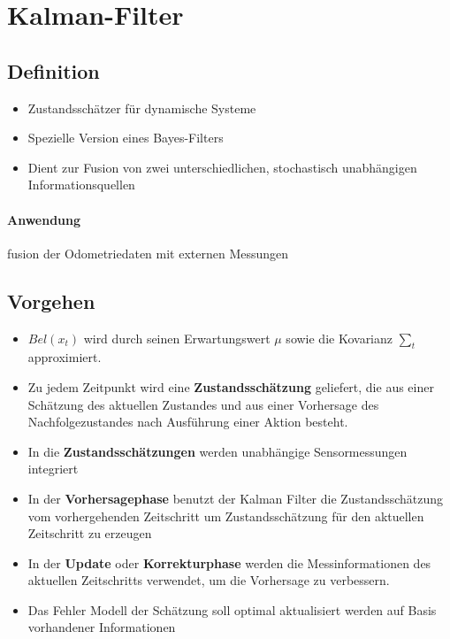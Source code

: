 \section{Kalman-Filter}
\subsection{Definition}
\begin{itemize}
	\item Zustandsschätzer für dynamische Systeme
	\item Spezielle Version eines Bayes-Filters
	\item Dient zur Fusion von zwei unterschiedlichen, stochastisch unabhängigen Informationsquellen
\end{itemize}
\paragraph{Anwendung} fusion der Odometriedaten mit externen Messungen
\subsection{Vorgehen}
\begin{itemize}
	\item $Bel(x_t)$ wird durch seinen Erwartungswert $\mu$ sowie die Kovarianz $\sum_t$ approximiert.
	\item Zu jedem Zeitpunkt wird eine \textbf{Zustandsschätzung} geliefert, die aus einer Schätzung des aktuellen Zustandes und aus einer Vorhersage des Nachfolgezustandes nach Ausführung einer Aktion besteht.
	\item In die \textbf{Zustandsschätzungen} werden unabhängige Sensormessungen integriert
	\item In der \textbf{Vorhersagephase} benutzt der Kalman Filter die Zustandsschätzung vom vorhergehenden Zeitschritt um Zustandsschätzung für den aktuellen Zeitschritt zu erzeugen
	\item In der \textbf{Update} oder \textbf{Korrekturphase} werden die Messinformationen des aktuellen Zeitschritts verwendet, um die Vorhersage zu verbessern.
	\item Das Fehler Modell der Schätzung soll optimal aktualisiert werden auf Basis vorhandener Informationen
\end{itemize}

